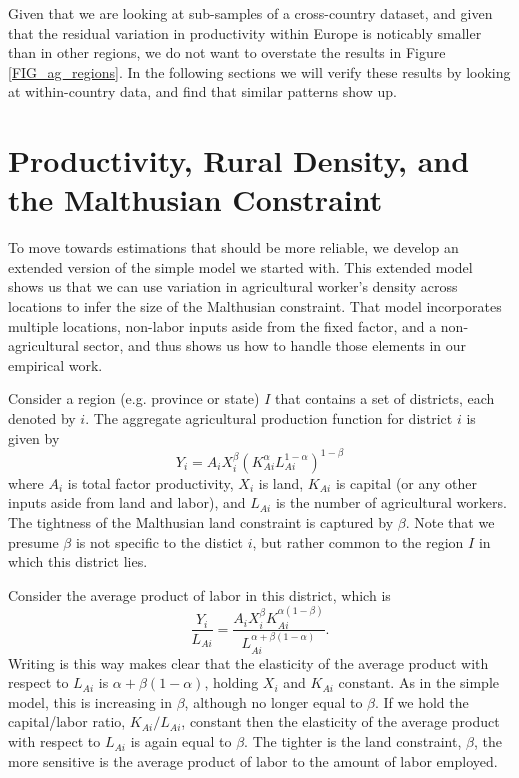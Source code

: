 \documentclass[11pt]{article}
\begin{document}
Given that we are looking at sub-samples of a cross-country dataset, and given that the residual variation in productivity within Europe is noticably smaller than in other regions, we do not want to overstate the results in Figure \ref{FIG_ag_regions}. In the following sections we will verify these results by looking at within-country data, and find that similar patterns show up.

\section{Productivity, Rural Density, and the Malthusian Constraint}
To move towards estimations that should be more reliable, we develop an extended version of the simple model we started with. This extended model shows us that we can use variation in agricultural worker's density across locations to infer the size of the Malthusian constraint. That model incorporates multiple locations, non-labor inputs aside from the fixed factor, and a non-agricultural sector, and thus shows us how to handle those elements in our empirical work.

Consider a region (e.g. province or state) $I$ that contains a set of districts, each denoted by $i$. The aggregate agricultural production function for district $i$ is given by 
\begin{equation}
Y_{i} = A_{i} X_{i}^{\beta} \left(K_{Ai}^{\alpha}L_{Ai}^{1-\alpha}\right)^{1-\beta} \label{EQ_production}
\end{equation}
where $A_{i}$ is total factor productivity, $X_{i}$ is land, $K_{Ai}$ is capital (or any other inputs aside from land and labor), and $L_{Ai}$ is the number of agricultural workers. The tightness of the Malthusian land constraint is captured by $\beta$. Note that we presume $\beta$ is not specific to the distict $i$, but rather common to the region $I$ in which this district lies.

Consider the average product of labor in this district, which is
\begin{equation}
	\frac{Y_i}{L_{Ai}} = \frac{A_{i} X_{i}^{\beta} K_{Ai}^{\alpha(1-\beta)}}{L_{Ai}^{\alpha + \beta(1-\alpha)}}. \nonumber
\end{equation}
Writing is this way makes clear that the elasticity of the average product with respect to $L_{Ai}$ is $\alpha + \beta(1-\alpha)$, holding $X_i$ and $K_{Ai}$ constant. As in the simple model, this is increasing in $\beta$, although no longer equal to $\beta$.  If we hold the capital/labor ratio, $K_{Ai}/L_{Ai}$, constant then the elasticity of the average product with respect to $L_{Ai}$ is again equal to $\beta$. The tighter is the land constraint, $\beta$, the more sensitive is the average product of labor to the amount of labor employed.
\end{document}
